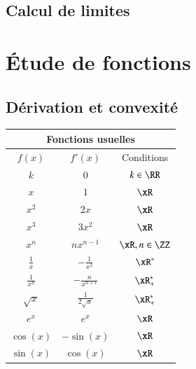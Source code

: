 \documentclass[oneside,12pt]{article}
\begin{document}
\subsection{Calcul de limites}

\theoreme{}{}





\newpage
\section{Étude de fonctions}

\subsection{Dérivation et convexité}

\begin{minipage}[t]{0.45\linewidth}
\center \large
\renewcommand{\arraystretch}{1.5}
\begin{tabular}{ | c | c | c |}
    \hline
    \multicolumn{3}{|c|}{\textbf{Fonctions usuelles}} \\ \hline \hline
    $f(x)$ & $f'(x)$ & Conditions \\ \hline \hline
    $k$ & $0$ & $k\in\RR$ \\ \hline
    $x$ & $1$& $\xR$\\ \hline
    $x^{2}$ & $2x$& $\xR$\\ \hline
    $x^{3}$ & $3x^{2}$& $\xR$\\ \hline
    $x^{n}$ & $nx^{n-1}$ & $\xR , n\in \ZZ$\\ \hline
    $\frac{1}{x}$ & $-\frac{1}{x^{2}}$ & $\xR^{*}$ \\ \hline
    $\frac{1}{x^{n}}$ & $-\frac{n}{x^{n+1}}$ & $\xR_{+}^{*}$ \\ \hline
    $\sqrt{x}$ & $\frac{1}{2\sqrt{x}}$ & $\xR^{*}_{+}$ \\ \hline
    $e^{x}$ & $e^{x}$ & $\xR$ \\ \hline
    $\cos(x)$ &  $-\sin(x)$ & $\xR$ \\ \hline
    $\sin(x)$ & $\cos(x)$ & $\xR$ \\ \hline
    \end{tabular}

\end{minipage} \hfill
\end{document}
